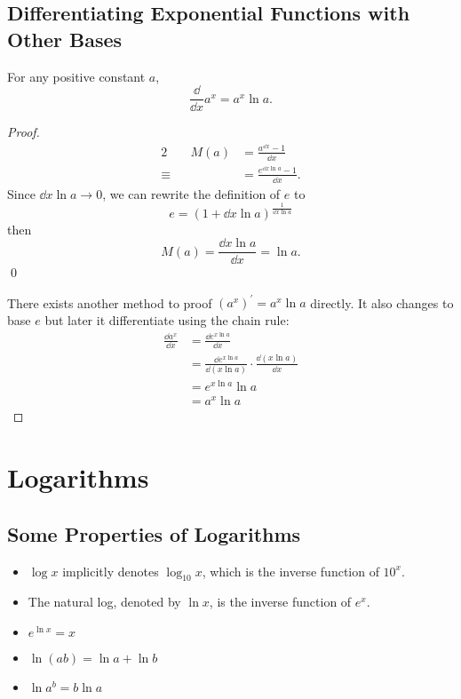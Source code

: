 \subsection{Differentiating Exponential Functions with Other Bases}
For any positive constant $a$,
\[\frac\dd{\dd x}a^x=a^x\ln a.\]
\begin{proof}
  \begin{alignat*}{2}
         && M(a) & =\frac{a^{\dd x}-1}{\dd x}\\
  \equiv &&      & =\frac{e^{\dd x\ln a}-1}{\dd x}.
  \end{alignat*}
  Since $\dd x\ln a\to0$, we can rewrite the definition of $e$ to
  \[e=(1+\dd x\ln a)^\frac1{\dd x\ln a}\]
  then
  \[M(a)=\frac{\dd x\ln a}{\dd x}=\ln a.\]
  \hfill\qed

  There exists another method to proof $(a^x)^\prime=a^x\ln a$ directly. It also changes to base $e$ but later it differentiate using the chain rule:
  \begin{align*}
    \frac{\dd a^x}{\dd x} & =\frac{\dd e^{x\ln a}}{\dd x}\\
                          & =\frac{\dd e^{x\ln a}}{\dd(x\ln a)}\cdot\frac{\dd(x\ln a)}{\dd x}\\
                          & =e^{x\ln a}\ln a\\
                          & =a^x\ln a
  \end{align*}
\end{proof}

\section{Logarithms}
\subsection{Some Properties of Logarithms}
\begin{itemize}
\item$\log x$ implicitly denotes $\log_{10}x$, which is the inverse function of $10^x$.
\item The natural log, denoted by $\ln x$, is the inverse function of $e^x$.
\item$e^{\ln x}=x$
\item$\ln(ab)=\ln a+\ln b$
\item$\ln a^b=b\ln a$
\end{itemize}
